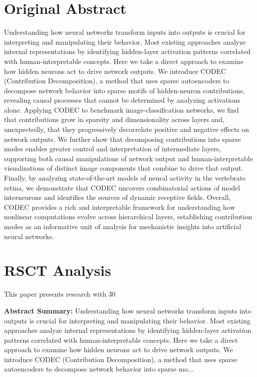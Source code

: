 \documentclass[11pt,a4paper]{article}
\begin{document}
\section{Original Abstract}
Understanding how neural networks transform inputs into outputs is crucial for interpreting and manipulating their behavior. Most existing approaches analyze internal representations by identifying hidden-layer activation patterns correlated with human-interpretable concepts. Here we take a direct approach to examine how hidden neurons act to drive network outputs. We introduce CODEC (Contribution Decomposition), a method that uses sparse autoencoders to decompose network behavior into sparse motifs of hidden-neuron contributions, revealing causal processes that cannot be determined by analyzing activations alone. Applying CODEC to benchmark image-classification networks, we find that contributions grow in sparsity and dimensionality across layers and, unexpectedly, that they progressively decorrelate positive and negative effects on network outputs. We further show that decomposing contributions into sparse modes enables greater control and interpretation of intermediate layers, supporting both causal manipulations of network output and human-interpretable visualizations of distinct image components that combine to drive that output. Finally, by analyzing state-of-the-art models of neural activity in the vertebrate retina, we demonstrate that CODEC uncovers combinatorial actions of model interneurons and identifies the sources of dynamic receptive fields. Overall, CODEC provides a rich and interpretable framework for understanding how nonlinear computations evolve across hierarchical layers, establishing contribution modes as an informative unit of analysis for mechanistic insights into artificial neural networks.

\section{RSCT Analysis}
This paper presents research with 30%

\textbf{Abstract Summary:} Understanding how neural networks transform inputs into outputs is crucial for interpreting and manipulating their behavior. Most existing approaches analyze internal representations by identifying hidden-layer activation patterns correlated with human-interpretable concepts. Here we take a direct approach to examine how hidden neurons act to drive network outputs. We introduce CODEC (Contribution Decomposition), a method that uses sparse autoencoders to decompose network behavior into sparse mo...
\end{document}
